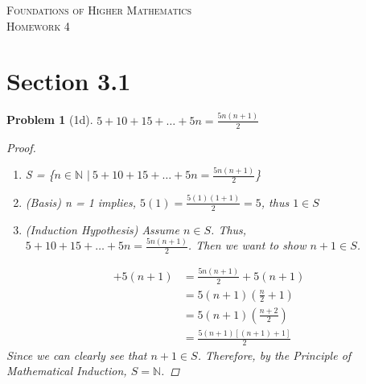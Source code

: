 \documentclass{article}
\theoremstyle{problem}
\newtheorem{prob}{Problem}
\begin{document}
\begin{center}
\textsc{\Large Foundations of Higher Mathematics}\\[.3cm]
\textsc{\Large Homework 4}
\end{center}


\section*{Section 3.1}
\begin{prob}[1d]
  $5 + 10 + 15 + \ldots + 5n = \frac{5n(n + 1)}{2}$
  \begin{proof}\ 
    \begin{enumerate}
      \item S = \{$n \in \mathbb{N}$ $|\ 5 + 10 + 15 + \ldots + 5n = \frac{5n(n + 1)}{2}$\}
      \item (Basis) n = 1 implies, $5(1) = \frac{5(1)(1 + 1)}{2} = 5$, thus $1 \in S$
      \item (Induction Hypothesis) Assume $n \in S$. Thus, $5 + 10 + 15 + \ldots + 5n = \frac{5n(n + 1)}{2}$. Then we want to show $n + 1 \in S$.      
    \end{enumerate}
    \begin{align*}
      [5 + 10 + 15 + \ldots + 5n] + 5(n + 1) &= \frac{5n(n + 1)}{2} + 5(n + 1) \tag*{(Induction hypothesis)}\\
      &= 5(n + 1)(\frac{n}{2} + 1)\\
      &= 5(n + 1)(\frac{n + 2}{2})\\
      &= \frac{5(n + 1)[(n+1) + 1]}{2}
    \end{align*}
    Since we can clearly see that $n + 1 \in S$. Therefore, by the Principle of Mathematical Induction, $S = \mathbb{N}$.
  \end{proof}
  \end{prob}
\end{document}

